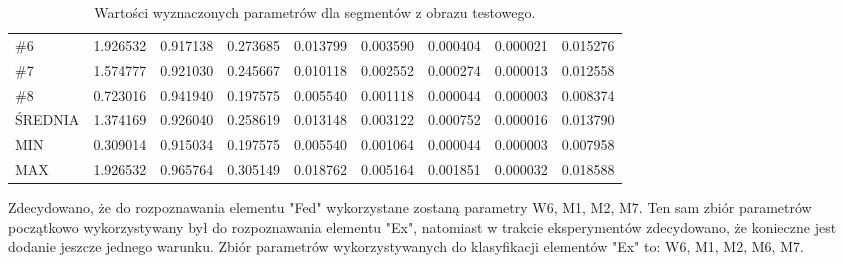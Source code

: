 \documentclass[12pt, oneside, final]{report}
\begin{document}
\begin{table}[ht!]
\begin{tabu}{|l|l|l|l|l|l|l|l|l|}
		\textcolor{ex}{\#6} & 1.926532 & 0.917138 & 0.273685 & 0.013799 & 0.003590 & 0.000404 & 0.000021 & 0.015276\\
		\textcolor{ex}{\#7} & 1.574777 & 0.921030 & 0.245667 & 0.010118 & 0.002552 & 0.000274 & 0.000013 & 0.012558\\
		\textcolor{ex}{\#8} & 0.723016 & 0.941940 & 0.197575 & 0.005540 & 0.001118 & 0.000044 & 0.000003 & 0.008374\\
		\hline
		ŚREDNIA & 1.374169 & 0.926040 & 0.258619 & 0.013148 & 0.003122 & 0.000752 & 0.000016 & 0.013790\\
		\hline
		MIN & 0.309014 & 0.915034 & 0.197575 & 0.005540 & 0.001064 & 0.000044 & 0.000003 & 0.007958\\
		\hline
		MAX & 1.926532 & 0.965764 & 0.305149 & 0.018762 & 0.005164 & 0.001851 & 0.000032 & 0.018588\\
		\hline
	\end{tabu}
	\caption{Wartości wyznaczonych parametrów dla segmentów z obrazu testowego.}
	\label{params}
\end{table}

Zdecydowano, że do rozpoznawania elementu "Fed" wykorzystane zostaną parametry W6, M1, M2, M7. Ten sam zbiór parametrów początkowo wykorzystywany był do rozpoznawania elementu "Ex", natomiast w trakcie eksperymentów zdecydowano, że konieczne jest dodanie jeszcze jednego warunku. Zbiór parametrów wykorzystywanych do klasyfikacji elementów "Ex" to: W6, M1, M2, M6, M7.
\end{document}

